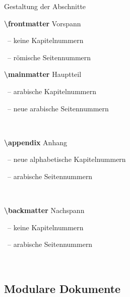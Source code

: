 \begin{Frame}[fragile]{Gestaltung der Abschnitte}
  \newlength{\descriptionwidth}
  
  \parbox[b]{\descriptionwidth}{
    \textcolor{texcs}{\ttfamily\bfseries\textbackslash frontmatter} Vorspann\\
    \strut\ \textcolor{maincolor}{--} keine Kapitelnummern\\
    \strut\ \textcolor{maincolor}{--} römische Seitennummern}

  \xxx

  \parbox[b]{\descriptionwidth}{
    \textcolor{texcs}{\ttfamily\bfseries\textbackslash mainmatter} Hauptteil\\
    \strut\ \textcolor{maincolor}{--} arabische Kapitelnummern\\
    \strut\ \textcolor{maincolor}{--} \alert{neue} arabische Seitennummern}
   \\
  
  \xxx

  \parbox[b]{\descriptionwidth}{
    \textcolor{texcs}{\ttfamily\bfseries\textbackslash appendix} Anhang\\
    \strut\ \textcolor{maincolor}{--} \alert{neue} alphabetische Kapitelnummern\\
    \strut\ \textcolor{maincolor}{--} arabische Seitennummern}
   \\
  
  \xxx

  \parbox[b]{\descriptionwidth}{
    \textcolor{texcs}{\ttfamily\bfseries\textbackslash backmatter} Nachspann\\
    \strut\ \textcolor{maincolor}{--} keine Kapitelnummern\\
    \strut\ \textcolor{maincolor}{--} arabische Seitennummern}
   \\
\end{Frame}

\subsection{Modulare Dokumente}


